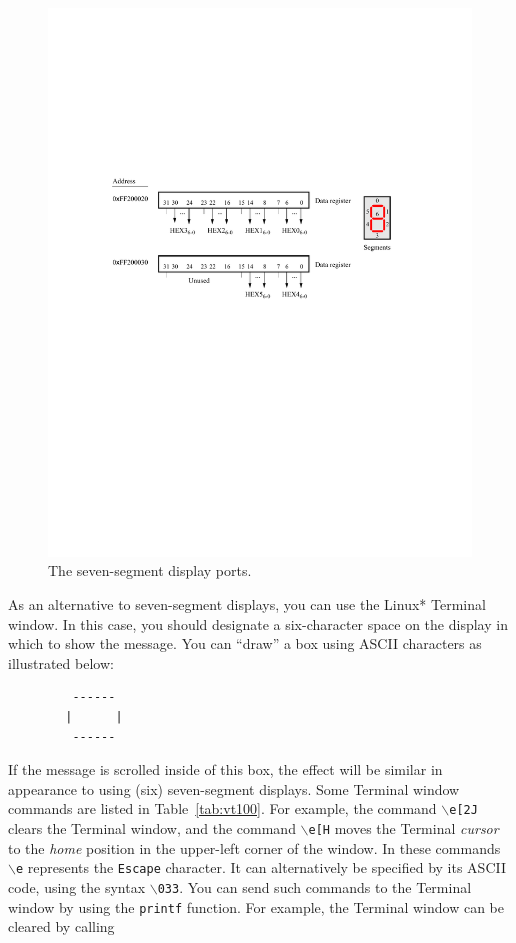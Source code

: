 \documentclass[epsfig,10pt,fullpage]{article}
\begin{document}
\begin{figure}[H]
   \begin{center}
       \includegraphics{figures/fig_segment_port.pdf}
   \end{center}
	\caption{The seven-segment display ports.}
\label{fig:segment}
\end{figure}


\noindent
As an alternative to seven-segment displays, you can use the Linux* Terminal window. In
this case, you should designate a six-character space on the display in which to show the
message. You can ``draw'' a box using ASCII characters as illustrated below:

\begin{lstlisting}
         ------
        |      |
         ------
\end{lstlisting}

\noindent
If the message is scrolled inside of this box, the effect will be similar in appearance to
using (six) seven-segment displays. Some Terminal window commands are listed in
Table~\ref{tab:vt100}. For 
example, the command \texttt{$\backslash$e[2J} clears the Terminal window, and the 
command \texttt{$\backslash$e[H} moves the Terminal {\it cursor} to the {\it home} position in 
the upper-left corner of the window.  In these commands \texttt{$\backslash$e} represents 
the \texttt{Escape} character. It can alternatively be specified by its ASCII code, using 
the syntax \texttt{$\backslash$033}. You can send such commands to the Terminal window by 
using the \texttt{printf} function. For example, the Terminal window can be cleared by calling 
\end{document}
